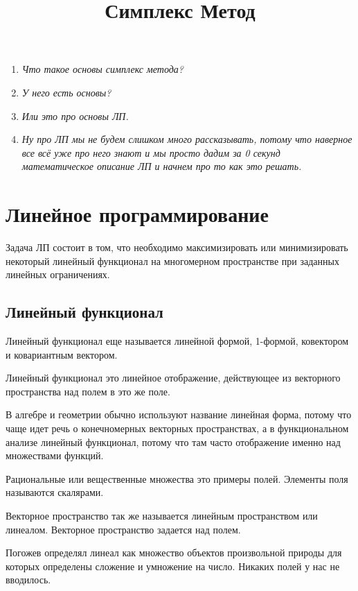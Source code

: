 \documentclass[a4paper,article,14pt]{extarticle}
\title{Симплекс Метод}
\begin{document}
\maketitle
\newpage
\tableofcontents
\newpage


\begin{enumerate}
    \item \textit{Что такое основы симплекс метода?}
    \item \textit{У него есть основы?}
    \item \textit{Или это про основы ЛП.}
    \item \textit{Ну про ЛП мы не будем слишком много рассказывать, потому что наверное все всё уже про него знают и мы просто дадим за 0 секунд математическое описание ЛП и начнем про то как это решать.}
\end{enumerate}

\section{Линейное программирование}

Задача ЛП состоит в том, что необходимо максимизировать или минимизировать некоторый линейный функционал на многомерном пространстве при заданных линейных ограничениях.

\subsection{Линейный функционал}

Линейный функционал еще называется линейной формой, 1-формой, ковектором и ковариантным вектором.

Линейный функционал это линейное отображение, действующее из векторного пространства над полем в это же поле.

В алгебре и геометрии обычно используют название линейная форма, потому что чаще идет речь о конечномерных векторных пространствах, а в функциональном анализе линейный функционал, потому что там часто отображение именно над множествами функций.

Рациональные или вещественные множества это примеры полей.
Элементы поля называются скалярами.

Векторное пространство так же называется линейным пространством или линеалом.
Векторное пространство задается над полем.

Погожев определял линеал как множество объектов произвольной природы для которых определены сложение и умножение на число.
Никаких полей у нас не вводилось.
\end{document}
